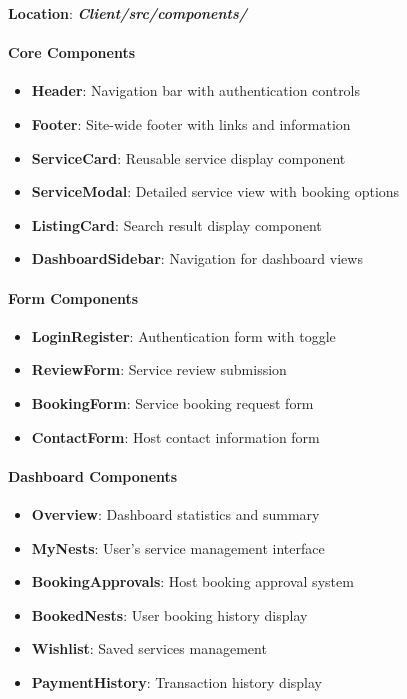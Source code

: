 \documentclass[12pt,a4paper]{article}
\newcommand{\folder}[1]{\textbf{\textit{#1}}}
\begin{document}
\textbf{Location}: \folder{Client/src/components/}

\paragraph{Core Components}
\begin{itemize}
\item \textbf{Header}: Navigation bar with authentication controls
\item \textbf{Footer}: Site-wide footer with links and information
\item \textbf{ServiceCard}: Reusable service display component
\item \textbf{ServiceModal}: Detailed service view with booking options
\item \textbf{ListingCard}: Search result display component
\item \textbf{DashboardSidebar}: Navigation for dashboard views
\end{itemize}

\paragraph{Form Components}
\begin{itemize}
\item \textbf{LoginRegister}: Authentication form with toggle
\item \textbf{ReviewForm}: Service review submission
\item \textbf{BookingForm}: Service booking request form
\item \textbf{ContactForm}: Host contact information form
\end{itemize}

\paragraph{Dashboard Components}
\begin{itemize}
\item \textbf{Overview}: Dashboard statistics and summary
\item \textbf{MyNests}: User's service management interface
\item \textbf{BookingApprovals}: Host booking approval system
\item \textbf{BookedNests}: User booking history display
\item \textbf{Wishlist}: Saved services management
\item \textbf{PaymentHistory}: Transaction history display
\end{itemize}
\end{document}
